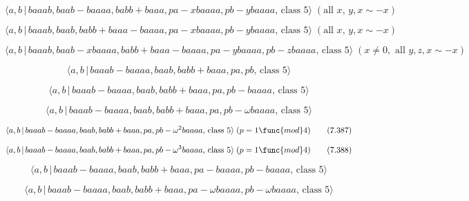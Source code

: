 \documentclass[10pt]{article}
\begin{document}
\begin{equation}
\langle a,b\,|\,baaab,baab-baaaa,babb+baaa,pa-xbaaaa,pb-ybaaaa,\,\text{class 
}5\rangle \;(\text{all }x,\,y,x\sim -x)  \tag{7.381}
\end{equation}

\begin{equation}
\langle a,b\,|\,baaab,baab,babb+baaa-baaaa,pa-xbaaaa,pb-ybaaaa,\,\text{class 
}5\rangle \;(\text{all }x,\,y,x\sim -x)  \tag{7.382}
\end{equation}

\begin{equation}
\langle a,b\,|\,baaab,baab-xbaaaa,babb+baaa-baaaa,pa-ybaaaa,pb-zbaaaa,\,%
\text{class }5\rangle \;(x\neq 0,\text{ all }y,z,x\sim -x)  \tag{7.383}
\end{equation}

\begin{equation}
\langle a,b\,|\,baaab-baaaa,baab,babb+baaa,pa,pb,\,\text{class }5\rangle 
\tag{7.384}
\end{equation}

\begin{equation}
\langle a,b\,|\,baaab-baaaa,baab,babb+baaa,pa,pb-baaaa,\,\text{class }%
5\rangle  \tag{7.385}
\end{equation}

\begin{equation}
\langle a,b\,|\,baaab-baaaa,baab,babb+baaa,pa,pb-\omega baaaa,\,\text{class }%
5\rangle  \tag{7.386}
\end{equation}

\begin{equation}
\langle a,b\,|\,baaab-baaaa,baab,babb+baaa,pa,pb-\omega ^{2}baaaa,\,\text{%
class }5\rangle \;(p=1\func{mod}4)  \tag{7.387}
\end{equation}

\begin{equation}
\langle a,b\,|\,baaab-baaaa,baab,babb+baaa,pa,pb-\omega ^{3}baaaa,\,\text{%
class }5\rangle \;(p=1\func{mod}4)  \tag{7.388}
\end{equation}

\begin{equation}
\langle a,b\,|\,baaab-baaaa,baab,babb+baaa,pa-baaaa,pb-baaaa,\,\text{class }%
5\rangle  \tag{7.389}
\end{equation}

\begin{equation}
\langle a,b\,|\,baaab-baaaa,baab,babb+baaa,pa-\omega baaaa,pb-\omega baaaa,\,%
\text{class }5\rangle  \tag{7.390}
\end{equation}
\end{document}
